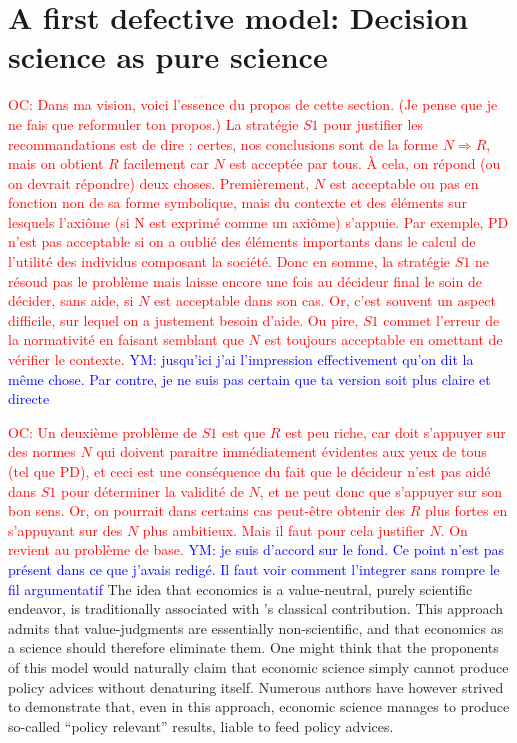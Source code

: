 \documentclass[preprint, french, english, 11pt]{elsarticle}%
\newcommand{\commentYM}[1]{\textcolor{blue}{YM: #1}}
\newcommand{\commentOC}[1]{\textcolor{red}{OC: #1}}
\begin{document}
\section{A first defective model: Decision science as pure science}
\commentOC{Dans ma vision, voici l’essence du propos de cette section. (Je pense que je ne fais que reformuler ton propos.) La stratégie $S1$ pour justifier les recommandations est de dire : certes, nos conclusions sont de la forme $N ⇒ R$, mais on obtient $R$ facilement car $N$ est acceptée par tous. À cela, on répond (ou on devrait répondre) deux choses. Premièrement, $N$ est acceptable ou pas en fonction non de sa forme symbolique, mais du contexte et des éléments sur lesquels l’axiôme (si N est exprimé comme un axiôme) s’appuie. Par exemple, PD n’est pas acceptable si on a oublié des éléments importants dans le calcul de l’utilité des individus composant la société. Donc en somme, la stratégie $S1$ ne résoud pas le problème mais laisse encore une fois au décideur final le soin de décider, sans aide, si $N$ est acceptable dans son cas. Or, c’est souvent un aspect difficile, sur lequel on a justement besoin d’aide. Ou pire, $S1$ commet l’erreur de la normativité en faisant semblant que $N$ est toujours acceptable en omettant de vérifier le contexte. }
\commentYM{jusqu'ici j'ai l'impression effectivement qu'on dit la même chose. Par contre, je ne suis pas certain que ta version soit plus claire et directe}

\commentOC{Un deuxième problème de $S1$ est que $R$ est peu riche, car doit s’appuyer sur des normes $N$ qui doivent paraitre immédiatement évidentes aux yeux de tous (tel que PD), et ceci est une conséquence du fait que le décideur n’est pas aidé dans $S1$ pour déterminer la validité de $N$, et ne peut donc que s’appuyer sur son bon sens. Or, on pourrait dans certains cas peut-être obtenir des $R$ plus fortes en s’appuyant sur des $N$ plus ambitieux. Mais il faut pour cela justifier $N$. On revient au problème de base.}
\commentYM{je suis d'accord sur le fond. Ce point n'est pas présent dans ce que j'avais redigé. Il faut voir comment l'integrer sans rompre le fil argumentatif}
The idea that economics is a value-neutral, purely scientific endeavor, is traditionally associated with \cite{robbins_essay_2007}'s classical contribution. This approach admits that value-judgments are essentially non-scientific, and that economics as a science should therefore eliminate them. One might think that the proponents of this model would naturally claim that economic science simply cannot produce policy advices without denaturing itself. Numerous authors have however strived to demonstrate that, even in this approach, economic science manages to produce so-called “policy relevant” results, liable to feed policy advices.
\end{document}
